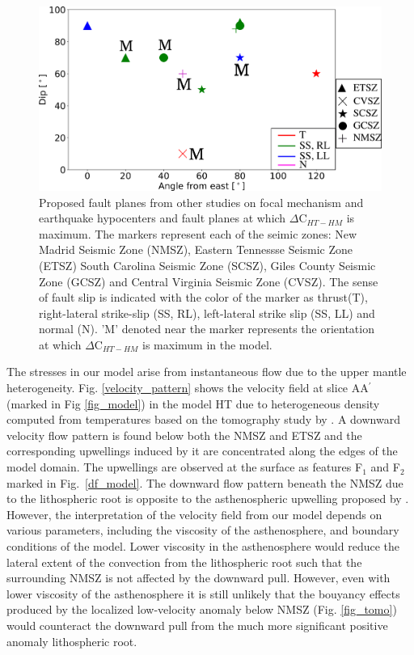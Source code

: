 \documentclass[draft,linenumbers]{agujournal2018}
\begin{document}
\begin{figure}[ht]
    \centering
    \includegraphics[width=0.8\linewidth]{figures/summ_stress.png}
    \caption{Proposed fault planes from other studies on focal mechanism and earthquake hypocenters and fault planes at which $\Delta$C$_{HT-HM}$ is maximum. The markers represent each of the seimic zones: New Madrid Seismic Zone (NMSZ), Eastern Tennessse Seismic Zone (ETSZ) South Carolina Seismic Zone (SCSZ), Giles County Seismic Zone (GCSZ) and Central Virginia Seismic Zone (CVSZ). The sense of fault slip is indicated with the color of the marker as thrust(T), right-lateral strike-slip (SS, RL), left-lateral strike slip (SS, LL) and normal (N). 'M' denoted near the marker represents the orientation at which $\Delta$C$_{HT-HM}$ is maximum in the model.}
    \label{summary}
\end{figure}
 
%    

    The stresses in our model arise from instantaneous flow due to the upper mantle heterogeneity. Fig. \ref{velocity_pattern} shows the velocity field at slice AA$^{\prime}$ (marked in Fig \ref{fig_model}) in the model HT due to heterogeneous density computed from temperatures based on the tomography study by \citet{Biryol_2016}. A downward velocity flow pattern is found below both the NMSZ and ETSZ and the corresponding upwellings induced by it are concentrated along the edges of the model domain. The upwellings are observed at the surface as features F$_1$ and F$_2$ marked in Fig.~\ref{df_model}. The downward flow pattern beneath the NMSZ due to the lithospheric root is opposite to the asthenospheric upwelling proposed by \citet{Biryol_2016}. However, the interpretation of the velocity field from our model depends on various parameters, including the viscosity of the asthenosphere, and boundary conditions of the model. %
    Lower viscosity in the asthenosphere would reduce the lateral extent of the convection from the lithospheric root such that the surrounding NMSZ is not affected by the downward pull. However, even with lower viscosity of the asthenosphere it is still unlikely that the bouyancy effects produced by the localized low-velocity anomaly below NMSZ (Fig. \ref{fig_tomo}) would counteract the downward pull from the much more significant positive anomaly lithospheric root. 
    
\end{document}

